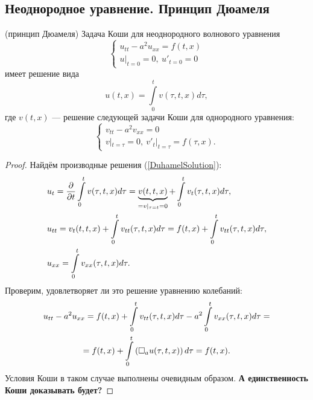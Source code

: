 \subsection{Неоднородное уравнение. Принцип Дюамеля}
    \begin{theorem}
        (принцип Дюамеля) Задача Коши для неоднородного волнового уравнения
        \begin{equation*}
            \begin{cases}
                u_{tt} - a^2 u_{xx} = f(t,x) \\
                u|_{t=0} = 0,\: u'_{t=0} = 0
            \end{cases}
        \end{equation*}
        имеет решение вида
        \begin{equation}
            u(t,x) = \int\limits_0^t v(\tau, t, x) d\tau, \label{DuhamelSolution}
        \end{equation}
        где $v(t,x)$ --- решение следующей задачи Коши для однородного уравнения:
        \begin{equation}
            \begin{cases}
                v_{tt} - a^2 v_{xx} = 0\\
                v|_{t = \tau} = 0,\: v'_t|_{t = \tau} = f(\tau, x). \label{CauchyDuhamel}
            \end{cases}
        \end{equation}
    \end{theorem}
    \begin{proof}
        Найдём производные решения (\ref{DuhamelSolution}):
        \begin{align*}
            & u_t = \frac{\partial}{\partial t} \int\limits_0^t v(\tau, t, x) d\tau = \underbrace{v(t, t, x)}_{= v|_{\tau = t} = 0} + \int\limits_0^t v_t(\tau, t, x) d\tau,\\
            & u_{tt} = v_t(t, t, x) + \int\limits_0^t v_{tt}(\tau, t, x) d\tau = f(t, x) + \int\limits_0^t v_{tt}(\tau, t, x) d\tau,\\
            & u_{xx} = \int\limits_0^t v_{xx}(\tau, t ,x) d\tau.
        \end{align*}
        Проверим, удовлетворяет ли это решение уравнению колебаний:
        \begin{gather*}
            u_{tt} - a^2 u_{xx} = f(t, x) + \int\limits_0^t v_{tt}(\tau, t, x) d\tau - a^2 \int\limits_0^t v_{xx}(\tau, t ,x) d\tau = \\
            = f(t, x) + \int\limits_0^t \left({\Box_a u(\tau, t, x)}\right) d\tau = f(t, x).
        \end{gather*}
        Условия Коши в таком случае выполнены очевидным образом.
        \textbf{А единственность Коши доказывать будет?}
    \end{proof}
